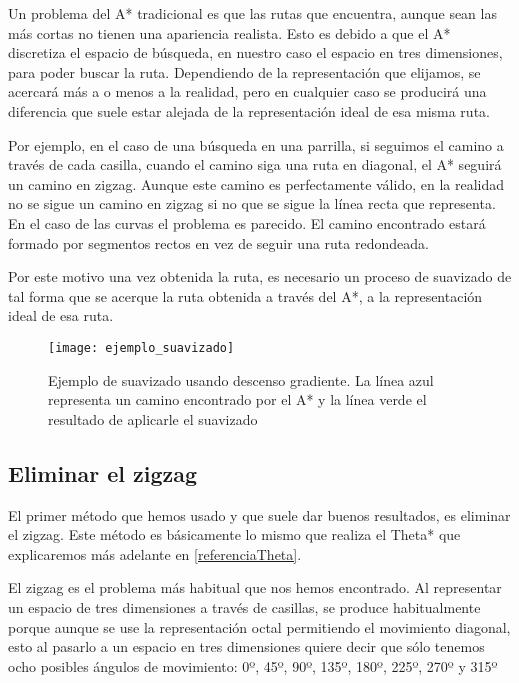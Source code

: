 Un problema del A* tradicional es que las rutas que encuentra, aunque sean las más cortas no tienen una apariencia realista. Esto es debido a que el A* discretiza el espacio de búsqueda, en nuestro caso el espacio en tres dimensiones, para poder buscar la ruta. Dependiendo de la representación que elijamos, se acercará más a o menos a la realidad, pero en cualquier caso se producirá una diferencia que suele estar alejada de la representación ideal de esa misma ruta.

Por ejemplo, en el caso de una búsqueda en una parrilla, si seguimos el camino a través de cada casilla, cuando el camino siga una ruta en diagonal, el A* seguirá un camino en zigzag. Aunque este camino es perfectamente válido, en la realidad no se sigue un camino en zigzag si no que se sigue la línea recta que representa. En el caso de las curvas el problema es parecido. El camino encontrado estará formado por segmentos rectos en vez de seguir una ruta redondeada.

Por este motivo una vez obtenida la ruta, es necesario un proceso de suavizado de tal forma que se acerque la ruta obtenida a través del A*, a la representación ideal de esa ruta.

\begin{figure}[htpb]
    \centering
    \texttt{[image: ejemplo\_suavizado]}
    \caption[Ejemplo de suavizado usando descenso gradiente]{Ejemplo de suavizado usando descenso gradiente. La línea azul representa un camino encontrado por el A* y la línea verde el resultado de aplicarle el suavizado}
    \label{fig:basics AFM sketch}
\end{figure}

\subsection{Eliminar el zigzag}

El primer método que hemos usado y que suele dar buenos resultados, es eliminar el zigzag. Este método es básicamente lo mismo que realiza el Theta* que explicaremos más adelante en \ref{referenciaTheta}.

El zigzag es el problema más habitual que nos hemos encontrado. Al representar un espacio de tres dimensiones a través de casillas, se produce habitualmente porque aunque se use la representación octal permitiendo el movimiento diagonal, esto al pasarlo a un espacio en tres dimensiones quiere decir que sólo tenemos ocho posibles ángulos de movimiento: 0º, 45º, 90º, 135º, 180º, 225º, 270º y 315º

